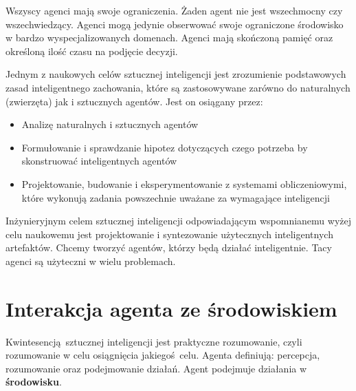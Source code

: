 \documentclass[a4paper, 12pt,oneside]{book}
\begin{document}
Wszyscy agenci mają swoje ograniczenia. Żaden agent nie jest wszechmocny czy 
wszechwiedzący. Agenci mogą jedynie obserwować swoje ograniczone środowisko
w bardzo wyspecjalizowanych domenach. Agenci mają skończoną pamięć oraz
określoną ilość czasu na podjęcie decyzji.

Jednym z naukowych celów sztucznej inteligencji jest zrozumienie podstawowych
zasad inteligentnego zachowania, które są zastosowywane zarówno do
naturalnych (zwierzęta) jak i sztucznych
agentów\cite{ai_foundations_scientific_goal}.
Jest on osiągany przez:
\begin{itemize}
	\setlength\itemsep{-0.4em}
	\item Analizę naturalnych i sztucznych agentów
	\item Formułowanie i sprawdzanie hipotez dotyczących czego potrzeba
		by skonstruować inteligentnych agentów
	\item Projektowanie, budowanie  i eksperymentowanie z systemami
		obliczeniowymi, które wykonują zadania powszechnie uważane
		za wymagające inteligencji
\end{itemize}
Inżynieryjnym celem sztucznej inteligencji odpowiadającym wspomnianemu wyżej
celu naukowemu jest projektowanie i syntezowanie
użytecznych inteligentnych artefaktów. Chcemy tworzyć agentów, którzy będą
działać inteligentnie. Tacy agenci są użyteczni w wielu problemach.

\section{Interakcja agenta  ze środowiskiem}
Kwintesencją sztucznej inteligencji jest praktyczne rozumowanie, czyli
rozumowanie w celu osiągnięcia jakiegoś celu. Agenta definiują:
percepcja, rozumowanie oraz podejmowanie działań. Agent podejmuje działania w
\textbf{środowisku}.
\end{document}
